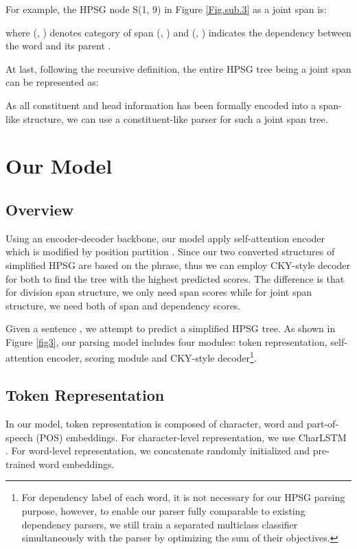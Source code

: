 \documentclass[11pt,a4paper]{article}
\begin{document}
For example, the HPSG node S(1, 9) in Figure \ref{Fig.sub.3} as a joint span is:

where (, ) denotes category of span
(, ) and (, ) indicates the dependency
between the word  and its parent . 

At last, following the recursive definition, the entire HPSG tree  being a joint span can be represented as:

As all constituent and head information has been formally encoded into a span-like structure, we can use a constituent-like parser for such a joint span tree.

\label{Two structure of Simplified HPSG}

\section{Our Model}

\subsection{Overview}

Using an encoder-decoder backbone, our model apply self-attention encoder \cite{Vaswani17} which is modified by position partition \cite{Kitaev-2018-SelfAttentive}.
Since our two converted structures of simplified HPSG are based on the phrase, thus we can employ CKY-style \cite{Cocke1970Programming, Younger1975Recognition, Kasami1965AN} decoder for both to find the tree with the highest predicted scores.
The difference is that for division span structure, we only need span scores while for joint span structure, we need both of span and dependency scores.

Given a sentence , we attempt to predict a simplified HPSG tree. As shown in Figure \ref{fig3}, our parsing model includes four modules: token representation, self-attention encoder, scoring module and CKY-style decoder\footnote{For dependency label of each word, it is not necessary for our HPSG parsing purpose, however, to enable  our parser fully comparable to existing dependency parsers, we still  train a separated multiclass classifier simultaneously with the parser by optimizing the sum of their objectives.}.

\subsection{Token Representation}

In our model, token representation  is composed of character, word and part-of-speech (POS) embeddings.
For character-level representation, we use CharLSTM \cite{Kitaev-2018-SelfAttentive}.
For word-level representation, we concatenate randomly initialized and pre-trained word embeddings.
\end{document}
